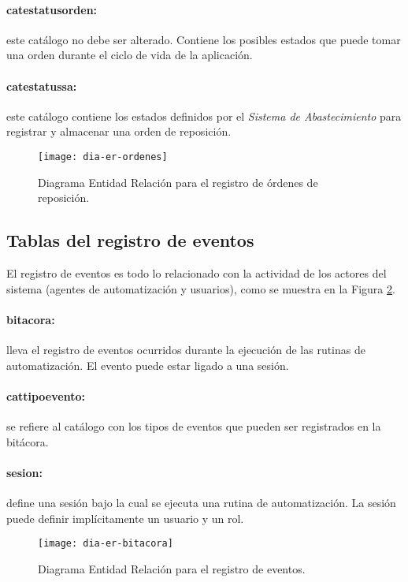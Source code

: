 \paragraph{cat{\textunderscore}estatus{\textunderscore}orden:} este catálogo no debe ser alterado. Contiene los posibles estados que puede tomar una orden durante el ciclo de vida de la aplicación.
\paragraph{cat{\textunderscore}estatus{\textunderscore}sa:} este catálogo contiene los estados definidos por el \textit{Sistema de Abastecimiento} para registrar y almacenar una orden de reposición.
\begin{figure}[h]
  \centering
  \texttt{[image: dia-er-ordenes]} 
  \caption{Diagrama Entidad Relación para el registro de órdenes de reposición.}
  \label{fig:dia-er-ordenes}
\end{figure}
\subsection{Tablas del registro de eventos}
El registro de eventos es todo lo relacionado con la actividad de los actores del sistema (agentes de automatización y usuarios), como se muestra en la Figura \ref{fig:dia-er-bitacora}.
\paragraph{bitacora:} lleva el registro de eventos ocurridos durante la ejecución de las rutinas de automatización. El evento puede estar ligado a una sesión.
\paragraph{cat{\textunderscore}tipo{\textunderscore}evento:} se refiere al catálogo con los tipos de eventos que pueden ser registrados en la bitácora.
\paragraph{sesion:} define una sesión bajo la cual se ejecuta una rutina de automatización. La sesión puede definir implícitamente un usuario y un rol.
\begin{figure}[h]
  \centering
  \texttt{[image: dia-er-bitacora]} 
  \caption{Diagrama Entidad Relación para el registro de eventos.}
  \label{fig:dia-er-bitacora}
\end{figure}

